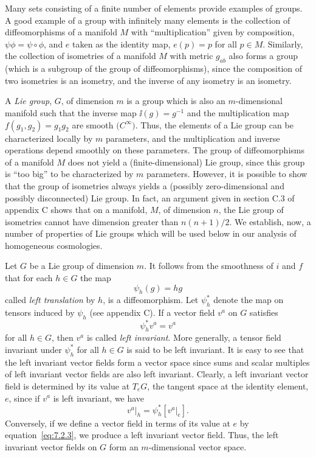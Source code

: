 Many sets consisting of a finite number of elements provide examples of groups. A
good example of a group with infinitely many elements is the collection of
diffeomorphisms of a manifold \(M\) with “multiplication” given by composition,
\(\psi\phi=\psi\circ\phi\), and \(e\) taken as the identity map,
\(e(p)=p\) for all \(p\in M\). Similarly, the collection of isometries of a
manifold \(M\) with metric \(g_{ab}\) also forms a group (which is a subgroup of the
group of diffeomorphisms), since the composition of two isometries is an isometry,
and the inverse of any isometry is an isometry.

A \emph{Lie group}, \(G\), of dimension \(m\) is a group which is also an
\(m\)-dimensional manifold such that the inverse map \(\ii(g)=g^{-1}\) and the
multiplication map \(f(g_1,g_2)=g_1g_2\) are smooth
\(\bigl(C^\infty\bigr)\). Thus, the elements of a Lie group can be characterized
locally by \(m\) parameters, and the multiplication and inverse operations depend
smoothly on these parameters. The group of diffeomorphisms of a manifold \(M\)
does not yield a (finite-dimensional) Lie group, since this group is “too big” to be
characterized by \(m\) parameters. However, it is possible to show that the group of
isometries always yields a (possibly zero-dimensional and possibly disconnected)
Lie group. In fact, an argument given in section C.3 of appendix C shows that on a
manifold, \(M\), of dimension \(n\), the Lie group of isometries cannot have
dimension greater than \(n(n+1)/2\). We establish, now, a number of properties of
Lie groups which will be used below in our analysis of homogeneous cosmologies.

Let \(G\) be a Lie group of dimension \(m\). It follows from the smoothness of \(i\)
and \(f\) that for each \(h\in G\) the map
\begin{equation}
  \psi_h(g)=hg
  \tag{7.2.1}\label{eq:7.2.1}
\end{equation}
called \emph{left translation} by \(h\), is a diffeomorphism. Let \(\psi_h^*\)
denote the map on tensors induced by \(\psi_h\) (see appendix C). If a vector field
\(v^a\) on \(G\) satisfies
\begin{equation}
  \psi_h^*v^a=v^a
  \tag{7.2.2}\label{eq:7.2.2}
\end{equation}
for all \(h\in G\), then \(v^a\) is called \emph{left invariant}. More generally, a
tensor field invariant under \(\psi_h^*\) for all \(h\in G\) is said to be left
invariant. It is easy to see that the left invariant vector fields form a vector space
since sums and scalar multiples of left invariant vector fields are also left invariant.
Clearly, a left invariant vector field is determined by its value at \(T_eG\), the
tangent space at the identity element, \(e\), since if \(v^a\) is left invariant, we
have
\begin{equation}
  \left.v^a\right|_h
    =\psi_h^*\!\left[\left.v^a\right|_e\right] .
  \tag{7.2.3}\label{eq:7.2.3}
\end{equation}
Conversely, if we define a vector field in terms of its value at \(e\) by
equation~\eqref{eq:7.2.3}, we produce a left invariant vector field. Thus, the left
invariant vector fields on \(G\) form an \(m\)-dimensional vector space.

